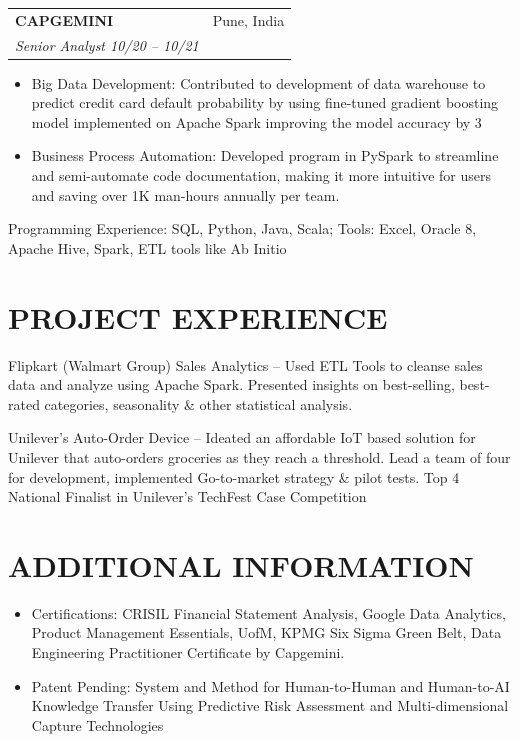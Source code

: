 \documentclass[10pt,letterpaper]{article}
\makeatletter
\newcommand{\resumeEntry}[4]{%
  \begin{tabularx}{\textwidth}{@{}Xr@{}}
    \textbf{#1} #2 & #3 \\
    \textit{#4} & \\
  \end{tabularx}
}
\makeatother
\begin{document}
\resumeEntry{CAPGEMINI}{}{Pune, India}{Senior Analyst \hfill 10/20 -- 10/21}
\begin{itemize}
  \item Big Data Development: Contributed to development of data warehouse to predict credit card default probability by using fine-tuned gradient boosting model implemented on Apache Spark improving the model accuracy by 3%
  \item Business Process Automation: Developed program in PySpark to streamline and semi-automate code documentation, making it more intuitive for users and saving over 1K man-hours annually per team.
\end{itemize}
Programming Experience: SQL, Python, Java, Scala; Tools: Excel, Oracle 8, Apache Hive, Spark, ETL tools like Ab Initio

\section*{PROJECT EXPERIENCE}
Flipkart (Walmart Group) Sales Analytics -- Used ETL Tools to cleanse sales data and analyze using Apache Spark. Presented insights on best-selling, best-rated categories, seasonality \& other statistical analysis.

Unilever's Auto-Order Device -- Ideated an affordable IoT based solution for Unilever that auto-orders groceries as they reach a threshold. Lead a team of four for development, implemented Go-to-market strategy \& pilot tests. Top 4 National Finalist in Unilever's TechFest Case Competition

\section*{ADDITIONAL INFORMATION}
\begin{itemize}
  \item Certifications: CRISIL Financial Statement Analysis, Google Data Analytics, Product Management Essentials, UofM, KPMG Six Sigma Green Belt, Data Engineering Practitioner Certificate by Capgemini.
  \item Patent Pending: System and Method for Human-to-Human and Human-to-AI Knowledge Transfer Using Predictive Risk Assessment and Multi-dimensional Capture Technologies
\end{itemize}
\end{document}
